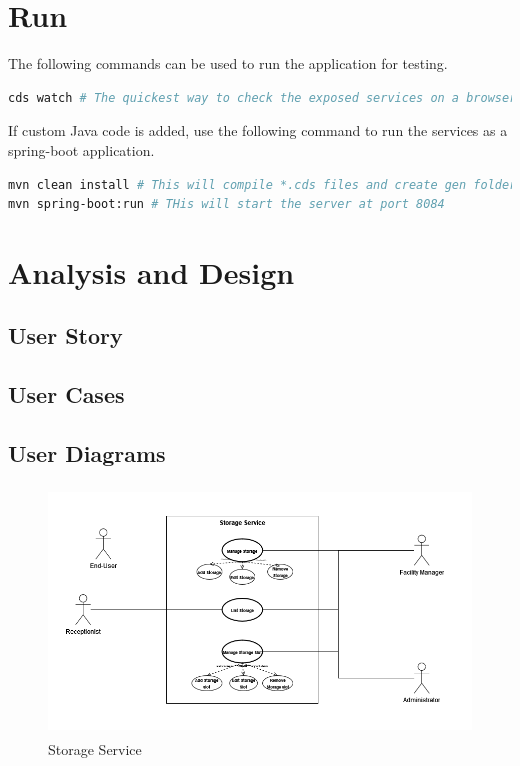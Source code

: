 \section{Run}
The following commands can be used to run the application for testing.

\begin{lstlisting}[language={bash}]
cds watch # The quickest way to check the exposed services on a browser.
\end{lstlisting}

If custom Java code is added, use the following command to run the services as a spring-boot application.
\begin{lstlisting}[language={bash}]
mvn clean install # This will compile *.cds files and create gen folder.
mvn spring-boot:run # THis will start the server at port 8084
\end{lstlisting}


\section{Analysis and Design}
\subsection{User Story}
\subsection{User Cases}
\subsection{User Diagrams}

\begin{figure}[H]
	\centering
	\includegraphics[height=250px]{images/User_Diagram-StorageService.png}
	\caption{Storage Service}
	\label{fig:service-1}
\end{figure}

